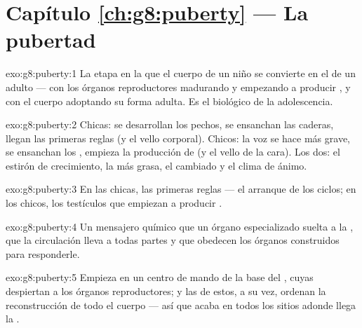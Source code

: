 \section*{Capítulo \ref{ch:g8:puberty} --- La pubertad}

\begin{solution}{exo:g8:puberty:1}
La etapa en la que el cuerpo de un niño se convierte en el de un adulto
--- con los órganos reproductores madurando y empezando a producir
, y con el cuerpo adoptando su forma adulta. Es el 
biológico de la adolescencia.
\end{solution}

\begin{solution}{exo:g8:puberty:2}
Chicas: se desarrollan los pechos, se ensanchan las caderas, llegan las
primeras reglas (y el vello corporal). Chicos: la voz se hace más
grave, se ensanchan los , empieza la producción de
 (y el vello de la cara). Los dos: el estirón de
crecimiento, la  más grasa, el  cambiado y el clima de ánimo.
\end{solution}

\begin{solution}{exo:g8:puberty:3}
En las chicas, las primeras reglas --- el arranque de los ciclos; en
los chicos, los testículos que empiezan a producir .
\end{solution}

\begin{solution}{exo:g8:puberty:4}
Un mensajero químico que un órgano especializado suelta a la ,
que la circulación lleva a todas partes y que obedecen los órganos
construidos para responderle.
\end{solution}

\begin{solution}{exo:g8:puberty:5}
Empieza en un centro de mando de la base del , cuyas 
despiertan a los órganos reproductores; y las  de estos, a su
vez, ordenan la reconstrucción de todo el cuerpo --- así que acaba en
todos los sitios adonde llega la .
\end{solution}

